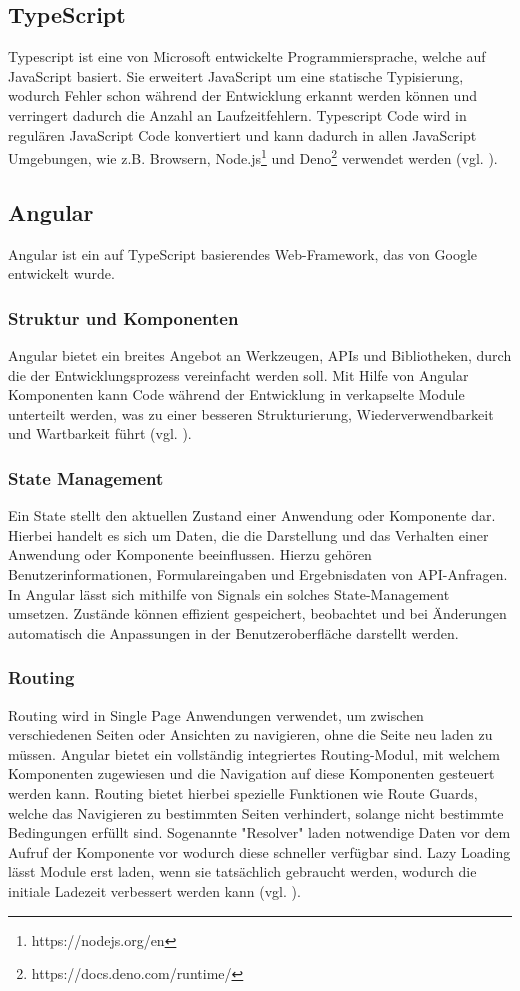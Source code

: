 \documentclass[oneside]{ausarbeitung}
\begin{document}
\subsection{TypeScript}
Typescript ist eine von Microsoft entwickelte Programmiersprache, welche auf JavaScript basiert. Sie erweitert JavaScript um eine statische Typisierung, wodurch Fehler schon während der Entwicklung erkannt werden können und verringert dadurch die Anzahl an Laufzeitfehlern. Typescript Code wird in regulären JavaScript Code konvertiert und kann dadurch in allen JavaScript Umgebungen, wie z.B. Browsern, Node.js\footnote{https://nodejs.org/en} und Deno\footnote{https://docs.deno.com/runtime/} verwendet werden (vgl. \parencite{typescript}). 

\subsection{Angular}
Angular ist ein auf TypeScript basierendes Web-Framework, das von Google entwickelt wurde. 

\subsubsection{Struktur und Komponenten}
Angular bietet ein breites Angebot an Werkzeugen, APIs und Bibliotheken, durch die der Entwicklungsprozess vereinfacht werden soll. Mit Hilfe von Angular Komponenten kann Code während der Entwicklung in verkapselte Module unterteilt werden, was zu einer besseren Strukturierung, Wiederverwendbarkeit und Wartbarkeit führt (vgl. \parencite{angular}).

\subsubsection{State Management}
Ein State stellt den aktuellen Zustand einer Anwendung oder Komponente dar. Hierbei handelt es sich um Daten, die die Darstellung und das Verhalten einer Anwendung oder Komponente beeinflussen. Hierzu gehören Benutzerinformationen, Formulareingaben und Ergebnisdaten von API-Anfragen. 
In Angular lässt sich mithilfe von Signals ein solches State-Management umsetzen. Zustände können effizient gespeichert, beobachtet und bei Änderungen automatisch die Anpassungen in der Benutzeroberfläche darstellt werden. 
\subsubsection{Routing}
Routing wird in Single Page Anwendungen verwendet, um zwischen verschiedenen Seiten oder Ansichten zu navigieren, ohne die Seite neu laden zu müssen. Angular bietet ein vollständig integriertes Routing-Modul, mit welchem Komponenten zugewiesen und die Navigation auf diese Komponenten gesteuert werden kann. Routing bietet hierbei spezielle Funktionen wie Route Guards, welche das Navigieren zu bestimmten Seiten verhindert, solange nicht bestimmte Bedingungen erfüllt sind. Sogenannte "Resolver" laden notwendige Daten vor dem Aufruf der Komponente vor wodurch diese schneller verfügbar sind. Lazy Loading lässt Module erst laden, wenn sie tatsächlich gebraucht werden, wodurch die initiale Ladezeit verbessert werden kann (vgl. \parencite{angular}).
\end{document}
